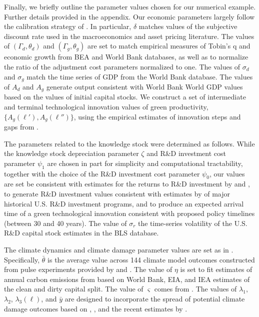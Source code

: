 \documentclass[12pt]{article}
\begin{document}
Finally, we briefly outline the parameter values chosen for our numerical example. Further details provided in the appendix. Our economic parameters largely follow the calibration strategy of \cite{BarnettBrockHansen:2021}. In particular, $\delta$ matches values of the subjective discount rate used in the macroeconomics and asset pricing literature. The values of $(\Gamma_d, \theta_d)$ and $(\Gamma_g, \theta_g)$ are set to match empirical measures of Tobin's q and economic growth from BEA and World Bank databases, as well as to normalize the ratio of the adjustment cost parameters normalized to one. The values of $\sigma_d$ and $\sigma_g$ match the time series of GDP from the World Bank database. The values of $A_d$ and $A_g$ generate output consistent with World Bank World GDP values based on the values of initial capital stocks. We construct a set of intermediate and  terminal technological innovation values of green productivity, $\{A_g(\ell'), A_g(\ell'')\}$, using the empirical estimates of innovation steps and gaps from \cite{Acemogluetal:2016}.

The parameters related to the knowledge stock were determined as follows. While the knowledge stock depreciation parameter $\zeta$ and R\&D investment cost parameter $\psi_1$ are chosen in part for simplicity and computational tractability, together with the choice of the R\&D investment cost parameter $\psi_0$, our values are set be consistent with estimates for the returns to R\&D investment by \cite{lucking2019have} and \cite{bloom2019toolkit}, to generate R\&D investment values consistent with estimates by \cite{stine2008manhattan} of major historical U.S. R\&D investment programs, and to produce an expected arrival time of a green technological innovation consistent with proposed policy timelines (between 30 and 40 years). The value of $\sigma_{r}$ the time-series volatility of the U.S. R\&D capital stock estimates in the BLS database. 

The climate dynamics and climate damage parameter values are set as in \cite{BarnettBrockHansenZhang:2023}. Specifically, $\bar{\theta}$ is the average value across 144 climate model outcomes constructed from pulse experiments provided by \cite{Joosetal:2013} and \cite{Geoffroy:2013}. The value of $\eta$ is set to fit estimates of annual carbon emissions from \cite{Figueresetal:2018} based on World Bank, EIA, and IEA estimates of the clean and dirty capital split. The value of $\varsigma$ comes from \cite{BarnettBrockHansen:2021}. The values of $\lambda_1$, $\lambda_2$, $\lambda_3(\ell)$, and $\bar{y}$ are designed to incorporate the spread of potential climate damage outcomes based on \cite{Nordhaus:2019}, \cite{Weitzman:2012}, and the recent estimates by \cite{waidelich2024climate}.
\end{document}

